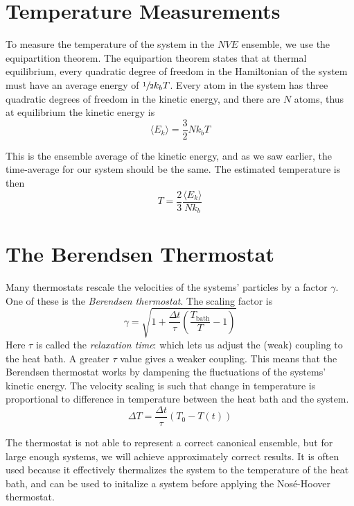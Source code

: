 \documentclass[12pt]{article}
\numberwithin{equation}{section}
\numberwithin{figure}{section}
\newcommand{\ita}[1]{\textit{#1}}
\begin{document}
\section{Temperature Measurements}
To measure the temperature of the system in the 
$NVE$ ensemble, we use the equipartition theorem.
The equipartion theorem states that at thermal equilibrium,
every quadratic degree of freedom in the Hamiltonian of the system
must have an average energy of $\sfrac{1}{2}k_b T$.
Every atom in the system has three quadratic degrees of freedom in the
kinetic energy, and there are $N$ atoms, thus at equilibrium the kinetic 
energy is
\begin{equation}
    \langle E_k \rangle = \frac{3}{2}N k_b T
\end{equation} 

This is the ensemble average of the kinetic energy,
and as we saw earlier, the time-average for our system should be the same.
The estimated temperature is then
\begin{equation}
    T = \frac{2}{3} \frac{\langle E_k \rangle}{N k_b}
\end{equation}


\section{The Berendsen Thermostat}
Many thermostats rescale the velocities of the systems' particles
by a factor $\gamma$. One of these is the \ita{Berendsen thermostat}.
The scaling factor is
\begin{equation}
    \gamma = \sqrt{1+\frac{\Delta t}{\tau}\left(
            \frac{T_{\text{bath}}}{T} - 1    
        \right)}
\end{equation}
Here $\tau$ is called the \ita{relaxation time}: which lets us
adjust the (weak) coupling to the heat bath. A greater $\tau$ value gives
a weaker coupling.
This means that the Berendsen thermostat works by dampening the
fluctuations of the systems' kinetic energy.
The velocity scaling is such that change in temperature is proportional
to difference in temperature between the heat bath and the system.
\begin{equation}
    \Delta T = \frac{\Delta t}{\tau}(T_0 - T(t))
\end{equation}

The thermostat is not able to represent a correct canonical ensemble,
but for large enough systems, we will achieve approximately
correct results.
It is often used because it effectively thermalizes the system to
the temperature of the heat bath,
and can be used to initalize a system before applying the Nosé-Hoover
thermostat.
\end{document}
